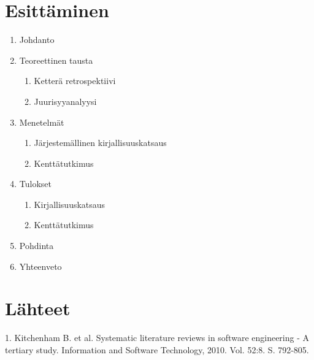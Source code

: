 \documentclass[12pt,a4paper,finnish,oneside]{article}
\begin{document}
\section{Esittäminen}

\begin{enumerate}
	\item Johdanto
	\item Teoreettinen tausta
	\begin{enumerate}	
		\item Ketterä retrospektiivi
		\item Juurisyyanalyysi
	\end{enumerate}
	\item Menetelmät
	\begin{enumerate}
		\item Järjestemällinen kirjallisuuskatsaus
		\item  Kenttätutkimus
	\end{enumerate}
	\item Tulokset
	\begin{enumerate}
		\item  Kirjallisuuskatsaus
		\item Kenttätutkimus
	\end{enumerate}
	\item Pohdinta
	\item  Yhteenveto
\end{enumerate}

\clearpage
\section{Lähteet}
1. Kitchenham B. et al. Systematic literature reviews in software engineering - A tertiary study. Information and Software Technology, 2010. Vol. 52:8. S. 792-805.

%


% 

\renewcommand{\refname}{Lähteet}  %



\end{document}
